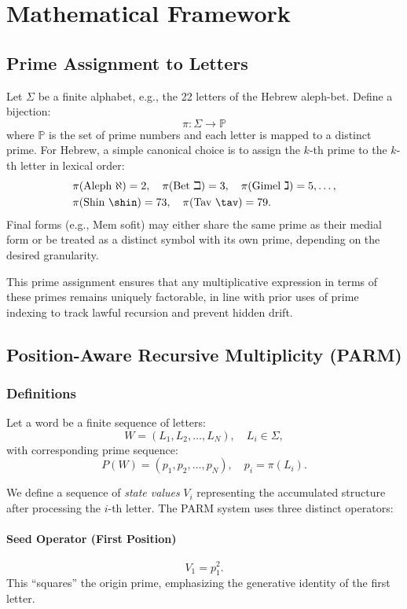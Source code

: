 \documentclass[11pt]{article}
\begin{document}
\section{Mathematical Framework}

\subsection{Prime Assignment to Letters}

Let $\Sigma$ be a finite alphabet, e.g., the 22 letters of the Hebrew aleph-bet. Define a bijection:
\[
\pi : \Sigma \to \mathbb{P}
\]
where $\mathbb{P}$ is the set of prime numbers and each letter is mapped to a distinct prime. For Hebrew, a simple canonical choice is to assign the $k$-th prime to the $k$-th letter in lexical order:
\[
\begin{aligned}
&\pi(\text{Aleph } \aleph) = 2, \quad \pi(\text{Bet } \beth) = 3, \quad \pi(\text{Gimel } \gimel) = 5, \dots, \\
&\pi(\text{Shin } \shin) = 73, \quad \pi(\text{Tav } \tav) = 79.
\end{aligned}
\]
Final forms (e.g., Mem sofit) may either share the same prime as their medial form or be treated as a distinct symbol with its own prime, depending on the desired granularity.

This prime assignment ensures that any multiplicative expression in terms of these primes remains uniquely factorable, in line with prior uses of prime indexing to track lawful recursion and prevent hidden drift.\cite{primeindexing,primeanchor}

\subsection{Position-Aware Recursive Multiplicity (PARM)}

\subsubsection{Definitions}

Let a word be a finite sequence of letters:
\[
W = (L_1, L_2, \dots, L_N), \quad L_i \in \Sigma,
\]
with corresponding prime sequence:
\[
P(W) = (p_1, p_2, \dots, p_N), \quad p_i = \pi(L_i).
\]

We define a sequence of \emph{state values} $V_i$ representing the accumulated structure after processing the $i$-th letter. The PARM system uses three distinct operators:

\paragraph{Seed Operator (First Position)}
\[
V_1 = p_1^2.
\]
This ``squares'' the origin prime, emphasizing the generative identity of the first letter.
\end{document}
